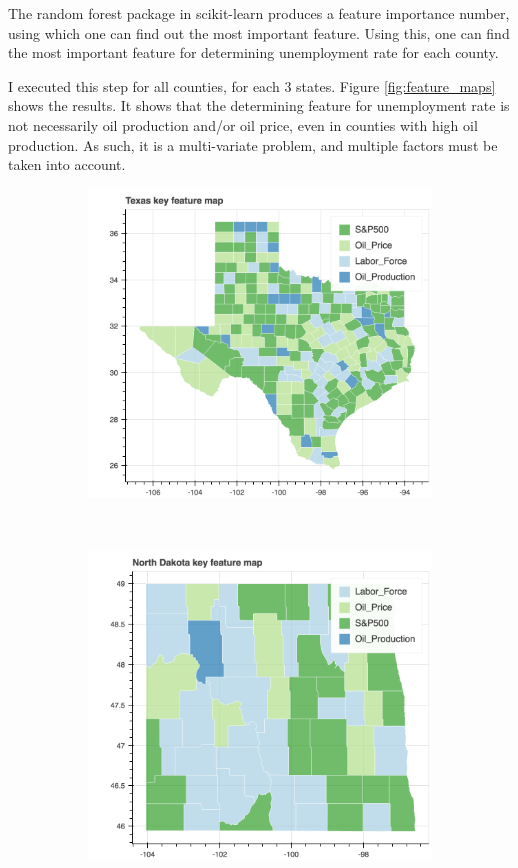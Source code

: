 \documentclass[11pt,letterpaper]{article}
\begin{document}
The random forest package in scikit-learn produces a feature importance number, using which one can find out the most important feature. Using this, one can find the most important feature for determining unemployment rate for each county. 

I executed this step for all counties, for each 3 states. Figure \ref{fig:feature_maps} shows the results. It shows that the determining feature for unemployment rate is not necessarily oil production and/or oil price, even in counties with high oil production. As such, it is a multi-variate problem, and multiple factors must be taken into account.

\begin{figure}[h!]
\centering
\begin{subfigure}{0.4\textwidth}
\includegraphics[width=\linewidth]{tx_feature}
\end{subfigure}
~
\begin{subfigure}{0.4\textwidth}
\includegraphics[width=\linewidth]{nd_feature}
\end{subfigure}


\end{figure}
\end{document}
